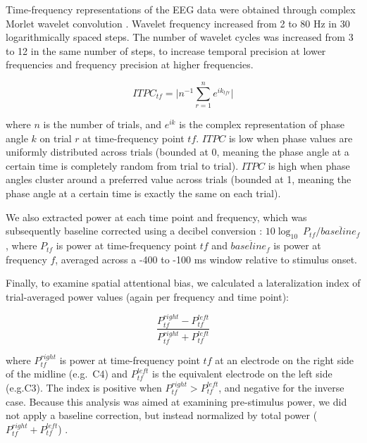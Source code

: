 \documentclass[11pt,english,]{memoir}
\begin{document}
Time-frequency representations of the EEG data were obtained through complex Morlet wavelet convolution \autocite{Cohen2014}. Wavelet frequency increased from 2 to 80 Hz in 30 logarithmically spaced steps. The number of wavelet cycles was increased from 3 to 12 in the same number of steps, to increase temporal precision at lower frequencies and frequency precision at higher frequencies.

\begin{equation*}
  ITPC_{tf} = \lvert n^{-1} \sum_{r=1}^{n} e^{ik_{tfr}} \rvert
\end{equation*}

\noindent where \(n\) is the number of trials, and \(e^{ik}\) is the complex representation of phase angle \(k\) on trial \(r\) at time-frequency point \(tf\). \(ITPC\) is low when phase values are uniformly distributed across trials (bounded at 0, meaning the phase angle at a certain time is completely random from trial to trial). \(ITPC\) is high when phase angles cluster around a preferred value across trials (bounded at 1, meaning the phase angle at a certain time is exactly the same on each trial).

We also extracted power at each time point and frequency, which was subsequently baseline corrected using a decibel conversion \autocite{Cohen2014}: \(10\log_{10}\ P_{tf}/\overline{baseline_f}\), where \(P_{tf}\) is power at time-frequency point \(tf\) and \(\overline{baseline_f}\) is power at frequency \(f\), averaged across a -400 to -100 ms window relative to stimulus onset.

Finally, to examine spatial attentional bias, we calculated a lateralization index of trial-averaged power values (again per frequency and time point):

\begin{equation*}
  \frac{P_{tf}^{right} - P_{tf}^{left}}{P_{tf}^{right} + P_{tf}^{left}}
\end{equation*}

\noindent where \(P_{tf}^{right}\) is power at time-frequency point \(tf\) at an electrode on the right side of the midline (e.g.~C4) and \(P_{tf}^{left}\) is the equivalent electrode on the left side (e.g.C3). The index is positive when
\(P_{tf}^{right} > P_{tf}^{left}\), and negative for the inverse case. Because this analysis was aimed at examining pre-stimulus power, we did not apply a baseline correction, but instead normalized by total power (\(P_{tf}^{right} + P_{tf}^{left}\)) \autocite[cf.][]{Handel2011}.
\end{document}
